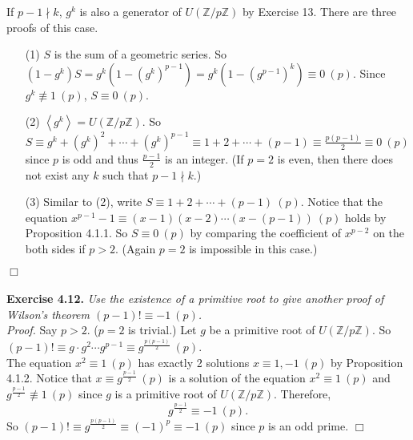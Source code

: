 \documentclass{article}
\begin{document}
If $p - 1 \nmid k$, $g^k$ is also a generator of $U(\mathbb{Z}/p\mathbb{Z})$ by Exercise 13.
There are three proofs of this case.
\begin{enumerate}
\item[(1)]
$S$ is the sum of a geometric series.
So $(1 - g^k) S = g^k (1 - (g^k)^{p - 1}) = g^k (1 - (g^{p - 1})^k) \equiv 0 \: (p)$.
Since $g^k \not\equiv 1 \: (p)$, $S \equiv 0 \: (p)$.
\item[(2)]
$\left \langle g^k \right \rangle = U(\mathbb{Z}/p\mathbb{Z})$. So
$S \equiv g^k + (g^k)^2 + \cdots + (g^k)^{p - 1} \equiv 1 + 2 + \cdots + (p - 1)
\equiv \frac{p(p - 1)}{2} \equiv 0 \: (p)$ since $p$ is odd and
thus $\frac{p - 1}{2}$ is an integer.
(If $p = 2$ is even, then there does not exist any $k$ such that $p - 1 \nmid k$.)
\item[(3)]
Similar to (2), write $S \equiv 1 + 2 + \cdots + (p - 1) \: (p)$. Notice that the equation
$x^{p - 1} - 1 \equiv (x - 1)(x - 2) \cdots (x - (p - 1)) \: (p)$ holds by Proposition 4.1.1.
So $S \equiv 0 \: (p)$ by comparing the coefficient of $x^{p - 2}$ on the both sides if $p > 2$.
(Again $p = 2$ is impossible in this case.)
\end{enumerate}

$\Box$ \\\\



\textbf{Exercise 4.12.} \emph{Use the existence of a primitive root to give another proof
of Wilson's theorem $(p - 1)! \equiv -1 \: (p)$.} \\

\emph{Proof.}
Say $p > 2$. ($p = 2$ is trivial.)
Let $g$ be a primitive root of $U(\mathbb{Z}/p\mathbb{Z})$.
So $(p - 1)! \equiv g \cdot g^2 \cdots g^{p - 1} \equiv g^{\frac{p(p - 1)}{2}} \: (p)$. \\

The equation $x^2 \equiv 1 \: (p)$ has exactly 2 solutions $x \equiv 1, -1 \: (p)$
by Proposition 4.1.2.
Notice that $x \equiv g^{\frac{p - 1}{2}} \: (p)$ is a solution of the equation
$x^2 \equiv 1 \: (p)$ and $g^{\frac{p - 1}{2}} \not\equiv 1 \: (p)$
since $g$ is a primitive root of $U(\mathbb{Z}/p\mathbb{Z})$.
Therefore, $$g^{\frac{p - 1}{2}} \equiv -1 \: (p).$$
So $(p - 1)! \equiv g^{\frac{p(p - 1)}{2}} \equiv (-1)^p \equiv -1 \: (p)$
since $p$ is an odd prime.
$\Box$ \\
\end{document}
